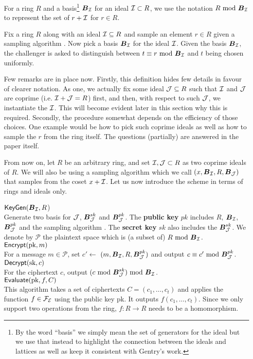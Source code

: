 For a ring $R$ and a basis\footnote{By the word ``basis'' we simply mean the set of generators for the ideal but we use that instead to highlight the connection between the ideals and lattices as well as keep it consistent with Gentry's work.} $\boldsymbol{B}_{\mathcal{I}}$ for an ideal $\mathcal{I} \subset R$, we use the notation $R \text{ mod } \boldsymbol{B}_{\mathcal{I}}$ to represent the set of $r + \mathcal{I}$ for $r \in R$.

\begin{definition}
	Fix a ring $R$ along with an ideal $\mathcal{I} \subseteq R$ and sample an element $r \in R$ given a sampling algorithm . Now pick a basis $\boldsymbol{B}_{\mathcal{I}}$ for the ideal $\mathcal{I}$. Given the basis $\boldsymbol{B}_{\mathcal{I}}$, the challenger is asked to distinguish between $t \equiv r \text{ mod } \boldsymbol{B}_{\mathcal{I}}$ and $t$ being chosen uniformly.
\end{definition}
Few remarks are in place now. Firstly, this definition hides few details in favour of clearer notation. As one, we actually fix some ideal $\mathcal{J} \subseteq R$ such that $\mathcal{I}$ and $\mathcal{J}$ are coprime (i.e. $\mathcal{I} + \mathcal{J} = R$) first, and then, with respect to such $\mathcal{J}$, we instantiate the $\mathcal{I}$. This will become evident later in this section why this is required. Secondly, the procedure somewhat depends on the efficiency of those choices. One example would be how to pick such coprime ideals as well as how to sample the $r$ from the ring itself. The questions (partially) are answered in the paper \cite{gentry_phd} itself.

From now on, let $R$ be an arbitrary ring, and set $\mathcal{I}, \mathcal{J} \subset R$ as two coprime ideals of $R$.  We will also be using a sampling algorithm which we call $(x, \boldsymbol{B}_{\mathcal{I}} , R, \boldsymbol{B}_{\mathcal{J}})$ that samples from the coset $x + \mathcal{I}$. Let us now introduce the scheme in terms of rings and ideals only.

\begin{mdframed}
	$\textsf{KeyGen}(\boldsymbol{B}_{\mathcal{I}}, R$) \\
	Generate two basis for $\mathcal{J}$, $\boldsymbol{B}_{\mathcal{J}}^{sk}$ and $\boldsymbol{B}_{\mathcal{J}}^{pk}$. The \textbf{public key} $pk$ includes $R$, $\boldsymbol{B}_{\mathcal{I}}$, $\boldsymbol{B}_{\mathcal{J}}^{pk}$ and the sampling algorithm . The \textbf{secret key} $sk$  also includes the $\boldsymbol{B}_{\mathcal{J}}^{sk}$. We denote by $\mathcal{P}$ the plaintext space which is (a subset of) $R \text{ mod } \boldsymbol{B}_{\mathcal{I}}$.\\
	$\textsf{Encrypt}(\text{pk}, m)$ \\
	For a message $m \in \mathcal{P}$, set $c' \leftarrow$ $(m, \boldsymbol{B}_{\mathcal{I}}, R, \boldsymbol{B}_{\mathcal{J}}^{pk})$ and output $c \equiv c' \text{ mod } \boldsymbol{B}_{\mathcal{J}}^{pk}$.\\
	$\textsf{Decrypt}(\text{sk}, c)$ \\
	For the ciphertext $c$, output $(c \text{ mod } \boldsymbol{B}_{\mathcal{J}}^{sk}) \text{ mod } \boldsymbol{B}_{\mathcal{I}}$.\\
	$\textsf{Evaluate}(\text{pk}, f, C)$ \\
	This algorithm takes a set of ciphertexts $C = (c_1, \ldots, c_t)$ and applies the function $f \in \mathcal{F}_{\mathcal{E}}$ using the public key pk. It outputs $f(c_1, \ldots, c_t)$. Since we only support two operations from the ring, $f: R \rightarrow R$ needs to be a homomorphism.
\end{mdframed}

